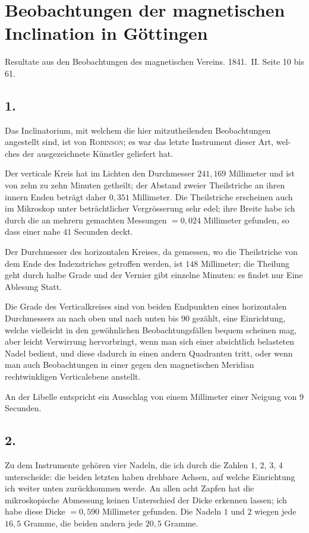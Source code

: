 \documentclass[12pt,a4paper]{article}
\begin{document}
\section*{Beobachtungen der magnetischen Inclination in Göttingen}

Resultate aus den Beobachtungen des magnetischen Vereins. 1841.~II. Seite 10 bis 61.

\subsection*{1.}
Das Inclinatorium, mit welchem die hier mitzutheilenden Beobachtungen
angestellt sind, ist von \textsc{Robinson}; es war das letzte Instrument dieser Art, wel-
ches der ausgezeichnete Künstler geliefert hat.

Der verticale Kreis hat im Lichten den Durchmesser $241{,}169$ Millimeter
und ist von zehn zu zehn Minuten getheilt; der Abstand zweier Theilstriche an ihren innern Enden beträgt daher $0{,}351$ Millimeter. Die Theilstriche erscheinen
auch im Mikroskop unter beträchtlicher Vergrösserung sehr edel; ihre Breite
habe ich durch die an mehrern gemachten Messungen $= 0{,}024$ Millimeter gefunden, so dass einer nahe $41$ Secunden deckt.

Der Durchmesser des horizontalen Kreises, da gemessen, wo die Theilstriche von dem Ende des Indexstriches getroffen werden, ist $148$ Millimeter; die Theilung geht durch halbe Grade und der Vernier gibt einzelne Minuten: es findet nur Eine Ablesung Statt.

Die Grade des Verticalkreises sind von beiden Endpunkten eines horizontalen Durchmessers an nach oben und nach unten bis $90$ gezählt, eine Einrichtung, welche vielleicht in den gewöhnlichen Beobachtungsfällen bequem scheinen mag, aber leicht Verwirrung hervorbringt, wenn man sich einer absichtlich belasteten Nadel bedient, und diese dadurch in einen andern Quadranten tritt, oder wenn man auch Beobachtungen in einer gegen den magnetischen Meridian rechtwinkligen Verticalebene anstellt.

An der Libelle entspricht ein Ausschlag von einem Millimeter einer Neigung von $9$ Secunden.

\subsection*{2.}
Zu dem Instrumente gehören vier Nadeln, die ich durch die Zahlen $1$, $2$, $3$, $4$
unterscheide: die beiden letzten haben drehbare Achsen, auf welche Einrichtung ich weiter unten zurückkommen werde. An allen acht Zapfen hat die mikroskopische Abmessung keinen Unterschied der Dicke erkennen lassen; ich habe diese Dicke $= 0{,}590$ Millimeter gefunden. Die Nadeln $1$ und $2$ wiegen jede $16{,}5$ Gramme, die beiden andern jede $20{,}5$ Gramme.
\end{document}
